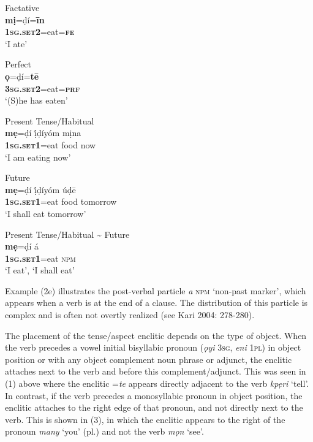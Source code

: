 \documentclass[output=paper]{langsci/langscibook}
\begin{document}
\ea
Factative\\
\gll  \textbf{mị}=ḍí=\textbf{\={i}n}\\
     \textbf{\textsc{1sg.set2}}=eat=\textbf{\textsc{fe}}\\
\glt ‘I ate’ \citep[44]{Kari1997}
\z

\ea
Perfect\\
\gll  \textbf{ọ}=ḍí=\textbf{t\={e}}\\
     \textbf{\textsc{3sg.set2}}=eat=\textbf{\textsc{prf}}\\
\glt ‘(S)he has eaten’ \citep[284]{Kari2004}
\z

\ea
Present Tense/Habitual\\
\gll  \textbf{mẹ}=ḍí     ị́ḍíyóm   mịna\\
     \textbf{\textsc{1sg.set1}}=eat   food   now\\
\glt ‘I am eating now’ \citep[45]{Kari1997}
\z

\ea
Future\\
\gll  \textbf{mẹ}=ḍí     ị́ḍíyóm   úḍ\={e}\\
     \textbf{\textsc{1sg.set1}}=eat   food   tomorrow\\
\glt ‘I shall eat tomorrow’ \citep[45]{Kari1997}
\z

\ea
Present Tense/Habitual {\textasciitilde} Future\\
\gll  \textbf{mẹ}=ḍí     á\\
     \textbf{\textsc{1sg.set1}}=eat  \textsc{npm}\\
\glt ‘I eat’, ‘I shall eat’ \citep[45]{Kari1997}
\z

Example (2e) illustrates the post-verbal particle \textit{a} \textsc{npm} ‘non-past marker’, which appears when a verb is at the end of a clause. The distribution of this particle is complex and is often not overtly realized (see Kari 2004: 278-280).

The placement of the tense/aspect enclitic depends on the type of object. When the verb precedes a vowel initial bisyllabic pronoun (\textit{ọyi} \textsc{3sg}, \textit{eni} \textsc{1pl}) in object position or with any object complement noun phrase or adjunct, the enclitic attaches next to the verb and before this complement/adjunct. This was seen in (1) above where the enclitic =\textit{te} appears directly adjacent to the verb \textit{kpẹri} ‘tell’. In contrast, if the verb precedes a monosyllabic pronoun in object position, the enclitic attaches to the right edge of that pronoun, and not directly next to the verb. This is shown in (3), in which the enclitic appears to the right of the pronoun \textit{many }‘you’ (pl.) and not the verb \textit{mọn} ‘see’.
\end{document}
